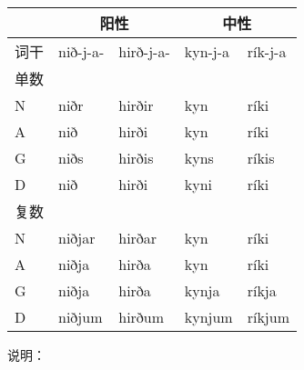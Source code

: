 \begin{longtable}{lllll}
  \toprule
       & \multicolumn{2}{c}{\textbf{阳性}} & \multicolumn{2}{c}{\textbf{中性}}                     \\
  \midrule
  \endhead
  \bottomrule
  \endfoot
  词干 & nið-j-a-                          & hirð-j-a-                         & kyn-j-a & rík-j-a \\
  单数 &                                   &                                   &         &         \\
  N    & niðr                              & hirðir                            & kyn     & ríki    \\
  A    & nið                               & hirði                             & kyn     & ríki    \\
  G    & niðs                              & hirðis                            & kyns    & ríkis   \\
  D    & nið                               & hirði                             & kyni    & ríki    \\
  复数 &                                   &                                   &         &         \\
  N    & niðjar                            & hirðar                            & kyn     & ríki    \\
  A    & niðja                             & hirða                             & kyn     & ríki    \\
  G    & niðja                             & hirða                             & kynja   & ríkja   \\
  D    & niðjum                            & hirðum                            & kynjum  & ríkjum  \\
\end{longtable}

说明：

